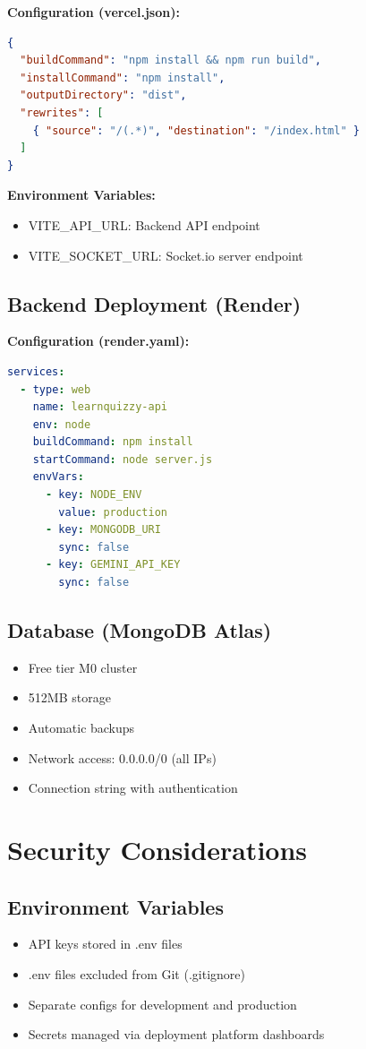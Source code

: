 \documentclass[12pt,a4paper]{article}
\begin{document}
\textbf{Configuration (vercel.json):}
\begin{lstlisting}[language=json]
{
  "buildCommand": "npm install && npm run build",
  "installCommand": "npm install",
  "outputDirectory": "dist",
  "rewrites": [
    { "source": "/(.*)", "destination": "/index.html" }
  ]
}
\end{lstlisting}

\textbf{Environment Variables:}
\begin{itemize}
    \item VITE\_API\_URL: Backend API endpoint
    \item VITE\_SOCKET\_URL: Socket.io server endpoint
\end{itemize}

\subsection{Backend Deployment (Render)}

\textbf{Configuration (render.yaml):}
\begin{lstlisting}[language=yaml]
services:
  - type: web
    name: learnquizzy-api
    env: node
    buildCommand: npm install
    startCommand: node server.js
    envVars:
      - key: NODE_ENV
        value: production
      - key: MONGODB_URI
        sync: false
      - key: GEMINI_API_KEY
        sync: false
\end{lstlisting}

\subsection{Database (MongoDB Atlas)}
\begin{itemize}
    \item Free tier M0 cluster
    \item 512MB storage
    \item Automatic backups
    \item Network access: 0.0.0.0/0 (all IPs)
    \item Connection string with authentication
\end{itemize}

\newpage

\section{Security Considerations}

\subsection{Environment Variables}
\begin{itemize}
    \item API keys stored in .env files
    \item .env files excluded from Git (.gitignore)
    \item Separate configs for development and production
    \item Secrets managed via deployment platform dashboards
\end{itemize}
\end{document}
